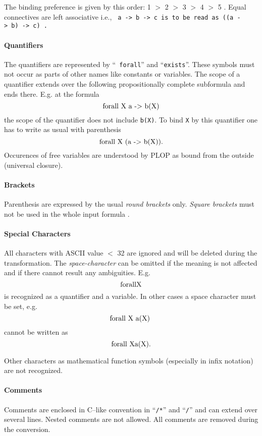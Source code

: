 The binding preference is given by this order:
1 $>$ 2 $>$ 3 $>$ 4 $>$ 5 . 
Equal connectives are left associative i.e.,
\tt 
\mbox{a -> b -> c} \rm is to be read as \tt \mbox{((a -> b) -> c)} 
\rm .

\paragraph{Quantifiers}
The quantifiers are represented by
``{\tt
forall}'' and ``{\tt exists}''.
These symbols must not occur as parts of other names like constants
or variables.
The scope of a quantifier extends over the following propositionally 
complete subformula and ends there.
E.g. at the formula
\[\tt 
\mbox{forall X a -> b(X)}  \\
\rm
\]
the scope of the quantifier does not include {\tt b(X)}.
To bind {\tt X} by this quantifier one has to write as usual with parenthesis
\[\tt 
\mbox{forall X (a -> b(X)).}\\
\rm
\]
Occurences of free variables are understood by PLOP as bound
from the outside (universal closure).

\paragraph{Brackets}
Parenthesis are expressed by the usual {\em round brackets} only.
{\em Square brackets} must not be used in the whole input formula .

\paragraph{Special Characters}
All characters with ASCII value $<$ 32 are ignored and will be deleted
during the transformation.
The {\em space-character} can be omitted if the meaning is not affected and if
there cannot result any ambiguities. 
E.g. 
\[\tt 
\mbox{forallX} \\
\rm
\]
is recognized as a quantifier and a variable. 
In other cases a space character must be set, e.g.
\[\tt 
\mbox{forall X a(X) }\\
\rm
\]
cannot be written as 
\[ \tt 
\mbox{forall Xa(X).}\\
\rm
\]


Other characters as mathematical function symbols (especially in
infix notation) are not recognized.

\paragraph{Comments}
Comments are enclosed in C--like convention in ``{\tt /*}'' and ``{\tt */}''
and can extend over several lines. Nested comments are not allowed.
All comments are removed during the conversion.

